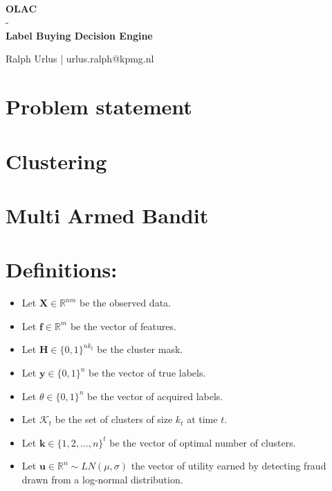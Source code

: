 \documentclass[paper=a4, fontsize=12pt]{scrartcl}
\begin{document}
\strut\\[0.8cm]
\begin{center}
\Large{\textbf{OLAC}\\
- \\
\textbf{Label Buying Decision Engine}}\\[5mm]
\normalsize
\end{center}

\vfill
\hfill Ralph Urlus | urlus.ralph@kpmg.nl
\thispagestyle{empty}

\newpage
\section*{Problem statement}


\newpage
\section*{Clustering}


\newpage
\section*{Multi Armed Bandit}


\newpage
\section*{Definitions:}
\begin{itemize}
\item Let $\mathbf{X} \in \mathbb{R}^{nm}$ be the observed data.
\item Let $\textbf{f} \in \mathbb{R}^{m}$ be the vector of features.
\item Let $\textbf{H} \in {\{0,1\}}^{nk_{t}}$ be the cluster mask.
\item Let $\textbf{y} \in {\{0,1\}}^n$ be the vector of true labels.
\item Let $\theta \in {\{0,1\}}^n$ be the vector of acquired labels.
\item Let $\mathcal{K}_{t}$ be the set of clusters of size $k_{t}$ at time $t$.
\item Let $\textbf{k} \in {\{1,2,\ldots,n\}}^{t}$ be the vector of optimal number of clusters.
\item Let $\textbf{u} \in \mathbb{R}^{n}\sim LN(\mu, \sigma)$ the vector of utility earned by detecting fraud drawn from a log-normal distribution.
\end{itemize}
\end{document}
